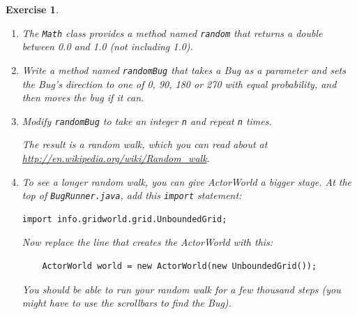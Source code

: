 \documentclass[12pt]{book}
\theoremstyle{exercise}
\newtheorem{exercise}{Exercise}[chapter]
\begin{document}
\begin{exercise}

\begin{enumerate}

\item The {\tt Math} class provides a method named {\tt random}
that returns a double between 0.0 and 1.0 (not including 1.0).

\item Write a method named {\tt randomBug} that takes a Bug as a
  parameter and sets the Bug's direction to one of 0, 90, 180 or 270
  with equal probability, and then moves the bug if it can.

\item Modify {\tt randomBug} to take an integer {\tt n} and repeat
{\tt n} times.

The result is a random walk, which you can read about
at \url{http://en.wikipedia.org/wiki/Random_walk}.

\item To see a longer random walk, you can give ActorWorld a bigger stage.
At the top of {\tt BugRunner.java}, add this {\tt import} statement:

\begin{lstlisting}
import info.gridworld.grid.UnboundedGrid;
\end{lstlisting}

Now replace the line that creates the ActorWorld with this:

\begin{lstlisting}
    ActorWorld world = new ActorWorld(new UnboundedGrid());
\end{lstlisting}

You should be able to run your random walk for a few thousand
steps (you might have to use the scrollbars to find the Bug).

\end{enumerate}
\end{exercise}
\end{document}
